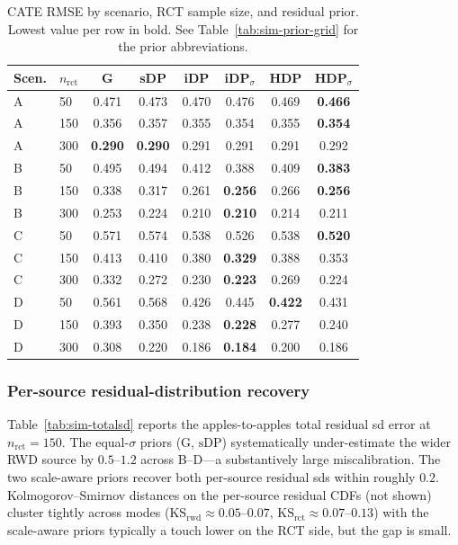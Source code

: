 \documentclass[11pt]{article}
\theoremstyle{plain}
\theoremstyle{definition}
\theoremstyle{remark}
\newcommand{\1}{\mathds{1}}
\newcommand{\mGauss}{\ensuremath{\mathrm{G}}}
\newcommand{\mShDP}{\ensuremath{\mathrm{sDP}}}
\begin{document}
\begin{table}[tb]
\centering
\small
\caption{CATE RMSE by scenario, RCT sample size, and residual prior.
Lowest value per row in bold. See
Table~\ref{tab:sim-prior-grid} for the prior abbreviations.}
\label{tab:sim-rmse}
\begin{tabular}{llcccccc}
\toprule
Scen. & $n_{\text{rct}}$ & G & sDP & iDP & iDP$_\sigma$ & HDP & HDP$_\sigma$ \\
\midrule
A & 50  & 0.471 & 0.473 & 0.470 & 0.476 & 0.469 & \textbf{0.466} \\
A & 150 & 0.356 & 0.357 & 0.355 & 0.354 & 0.355 & \textbf{0.354} \\
A & 300 & \textbf{0.290} & \textbf{0.290} & 0.291 & 0.291 & 0.291 & 0.292 \\
\midrule
B & 50  & 0.495 & 0.494 & 0.412 & 0.388 & 0.409 & \textbf{0.383} \\
B & 150 & 0.338 & 0.317 & 0.261 & \textbf{0.256} & 0.266 & \textbf{0.256} \\
B & 300 & 0.253 & 0.224 & 0.210 & \textbf{0.210} & 0.214 & 0.211 \\
\midrule
C & 50  & 0.571 & 0.574 & 0.538 & 0.526 & 0.538 & \textbf{0.520} \\
C & 150 & 0.413 & 0.410 & 0.380 & \textbf{0.329} & 0.388 & 0.353 \\
C & 300 & 0.332 & 0.272 & 0.230 & \textbf{0.223} & 0.269 & 0.224 \\
\midrule
D & 50  & 0.561 & 0.568 & 0.426 & 0.445 & \textbf{0.422} & 0.431 \\
D & 150 & 0.393 & 0.350 & 0.238 & \textbf{0.228} & 0.277 & 0.240 \\
D & 300 & 0.308 & 0.220 & 0.186 & \textbf{0.184} & 0.200 & 0.186 \\
\bottomrule
\end{tabular}
\end{table}

\subsubsection*{Per-source residual-distribution recovery}

Table~\ref{tab:sim-totalsd} reports the apples-to-apples total
residual sd error at $n_{\text{rct}} = 150$. The equal-$\sigma$ priors
(\mGauss, \mShDP) systematically
under-estimate the wider RWD source by $0.5\text{--}1.2$ across
B--D---a substantively large miscalibration. The two scale-aware
priors recover both per-source residual sds within roughly $0.2$.
Kolmogorov--Smirnov distances on the per-source residual CDFs (not
shown) cluster tightly across modes
($\mathrm{KS}_{\text{rwd}} \approx 0.05\text{--}0.07$,
$\mathrm{KS}_{\text{rct}} \approx 0.07\text{--}0.13$) with the
scale-aware priors typically a touch lower on the RCT side, but the
gap is small.
\end{document}
